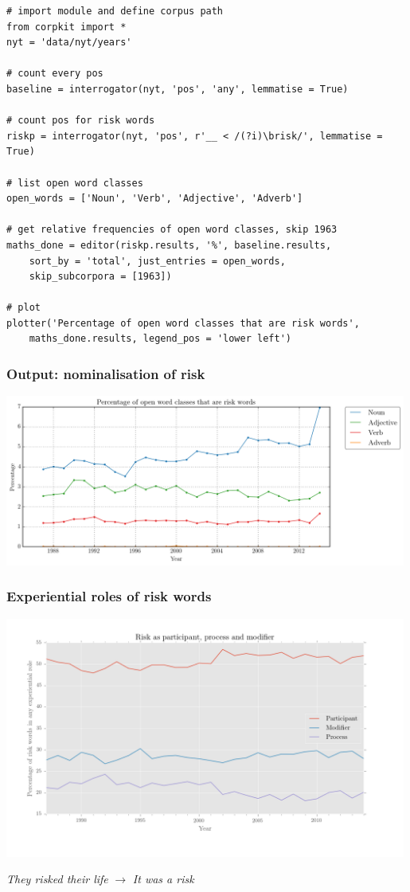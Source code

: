\documentclass{beamer}       %
\begin{document}
\begin{frame}[fragile]
    \begin{verbatim}
# import module and define corpus path
from corpkit import *
nyt = 'data/nyt/years'

# count every pos
baseline = interrogator(nyt, 'pos', 'any', lemmatise = True)

# count pos for risk words
riskp = interrogator(nyt, 'pos', r'__ < /(?i)\brisk/', lemmatise = True)

# list open word classes
open_words = ['Noun', 'Verb', 'Adjective', 'Adverb']

# get relative frequencies of open word classes, skip 1963
maths_done = editor(riskp.results, '%', baseline.results, 
    sort_by = 'total', just_entries = open_words, 
    skip_subcorpora = [1963])

# plot
plotter('Percentage of open word classes that are risk words', 
    maths_done.results, legend_pos = 'lower left')
    \end{verbatim}
\end{frame}

\begin{frame}
    \frametitle{Output: nominalisation of risk}
    \centering
    \includegraphics[width=0.99\textwidth]{../images/percentage-of-open-word-classes-that-are-risk-words}
\end{frame}

\begin{frame}
    \frametitle{Experiential roles of risk words}
    \centering
    \includegraphics[width=0.99\textwidth]{../images/ppm_final_colour}

    \noindent \emph{They risked their life} $\rightarrow$ \emph{It was a risk}
\end{frame}
\end{document}
